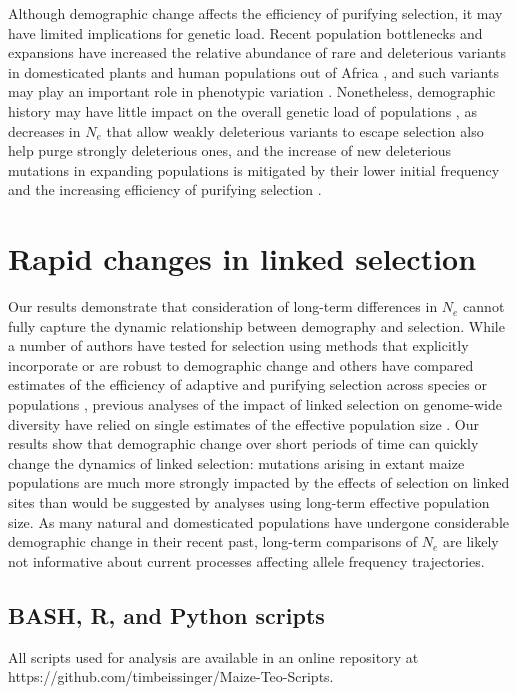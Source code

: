 \documentclass{pnastwo}
\begin{document}
\begin{article}
Although demographic change affects the efficiency of purifying selection, it may have limited implications for genetic load. 
Recent population bottlenecks and expansions have increased the relative abundance of rare and 
deleterious variants in domesticated plants \cite{Gunther:2010gt,renaut2015} and human populations out of Africa \cite{keinan2012,coventry2010}, and such variants may play an important role in phenotypic variation \cite{Mezmouk:2014es, coventry2010, eyre2010}.
Nonetheless, demographic history may have little impact on the overall genetic load of populations \cite{do2015,simons2014}, as decreases in $N_e$ that allow weakly deleterious variants to escape selection also help purge strongly deleterious ones, and the increase of new deleterious mutations in expanding populations is mitigated by their lower initial frequency and the increasing efficiency of purifying selection \cite{gazave2013, simons2014, lohmueller2014}. 

\section{Rapid changes in linked selection} %
Our results demonstrate that consideration of long-term differences in $N_e$ cannot fully capture the dynamic relationship between demography and selection. 
While a number of authors have tested for selection using methods that explicitly incorporate or are robust to demographic change \cite{eyre2009estimating, chen2010, zeng2010} and others have compared estimates of the efficiency of adaptive and purifying selection across species \cite{popadin2012} or populations \cite{Elyashiv:2010ga}, previous analyses of the impact of linked selection on genome-wide diversity have relied on single estimates of the effective population size \cite{corbett2015,leffler2012}.
Our results show that demographic change over short periods of time can quickly change the dynamics of linked selection: mutations arising in extant maize populations are much more strongly impacted by the effects of selection on linked sites than would be suggested by analyses using long-term effective population size.
As many natural and domesticated populations have undergone considerable demographic change in their recent past, long-term comparisons of $N_e$ are likely not informative about current processes affecting allele frequency trajectories.

\begin{materials} %

\subsection{BASH, R, and Python scripts}
All scripts used for analysis are available in an online repository at https://github.com/timbeissinger/Maize-Teo-Scripts. 


\end{materials}
\end{article}
\end{document}
